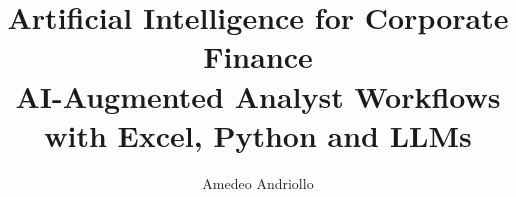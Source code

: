 
\livetrue
\title[AI Corporate Finance | S1]{Artificial Intelligence for Corporate Finance\\[2pt]\large AI-Augmented Analyst Workflows with Excel, Python and LLMs}
\author[Amedeo Andriollo]{Amedeo Andriollo}

\begin{frame}\titlepage\end{frame}



